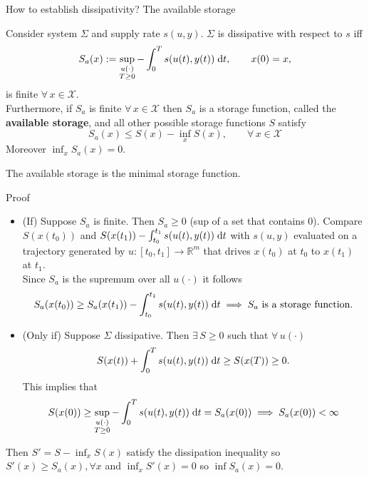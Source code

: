 \documentclass[aspectratio=169]{beamer}
\newcommand{\bbR}{\mathbb{R}}
\begin{document}
\begin{frame}{How to establish dissipativity? The available storage}
	
\begin{theorem}
Consider system $\Sigma$ and supply rate $s(u, y)$. $\Sigma$ is dissipative with respect to $s$ iff
\begin{equation}\label{eq:Sa}
	S_a(x):= \sup_{\substack{u(\cdot) \\ T \ge 0}} - \int_0^T s(u(t), y(t)) \d t, \qquad x(0) = x,
\end{equation}
is finite $\forall \, x \in \mathcal{X}$. \\
Furthermore, if $S_a$ is finite $\forall \, x \in \mathcal{X}$ then $S_a$ is a storage function, called the \textbf{available storage}, and all other possible storage functions $S$ satisfy
\begin{equation*}
	S_a(x) \le S(x) - \inf_x S(x), \qquad \forall \,  x \in \mathcal{X}
\end{equation*}
Moreover $\inf_x S_a(x)=0.$
\end{theorem}

The available storage is the minimal storage function.
	
\end{frame}

\begin{frame}{Proof}

		\begin{itemize}
			\item (If) Suppose $S_a$ is finite. Then $S_a \ge 0$ (sup of a set that contains 0).  Compare $S(x(t_0))$ and $S(x(t_1)) - \int_{t_0}^{t_1} s(u(t), y(t))\d t$ with $s(u, y)$ evaluated on a trajectory generated by $u: [t_0, t_1] \rightarrow \bbR^m$ that drives $x(t_0)$ at $t_0$ to $x(t_1)$ at $t_1$. \\
			Since $S_a$ is the supremum over all $u(\cdot)$ it follows
			\begin{equation*}
				S_a(x(t_0)) \ge S_a(x(t_1)) - \int_{t_0}^{t_1} s(u(t), y(t)) \d t \implies S_a \text{ is a storage function.}
			\end{equation*}
			\item (Only if) Suppose $\Sigma$ dissipative. Then $\exists\,  S \ge 0$ such that $\forall \, u(\cdot)$
			\begin{equation*}
				S(x(t)) + \int_0^T s(u(t), y(t)) \d t \ge S(x(T)) \ge 0.
			\end{equation*}
		This implies that $$S(x(0)) \ge \sup_{\substack{u(\cdot) \\ T \ge 0}} - \int_0^T s(u(t), y(t)) \d t = S_a(x(0)) \implies S_a(x(0)) < \infty$$
		\end{itemize}
		Then $S'= S - \inf_x S(x)$ satisfy the dissipation inequality so $S'(x) \ge S_a(x), \forall x$ and $\inf_x S'(x)=0$ so $\inf S_a(x)=0$.
\end{frame}
\end{document}
